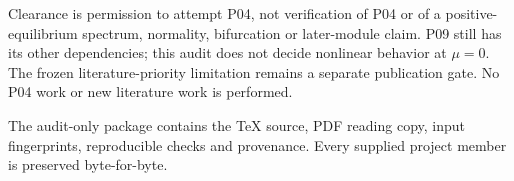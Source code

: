 \documentclass[11pt]{article}
\begin{document}
Clearance is permission to attempt P04, not verification of P04 or of a
positive-equilibrium spectrum, normality, bifurcation or later-module claim.
P09 still has its other dependencies; this audit does not decide nonlinear
behavior at $\mu=0$. The frozen literature-priority limitation remains a
separate publication gate. No P04 work or new literature work is performed.

The audit-only package contains the TeX source, PDF reading copy, input
fingerprints, reproducible checks and provenance. Every supplied project
member is preserved byte-for-byte.
\end{document}
